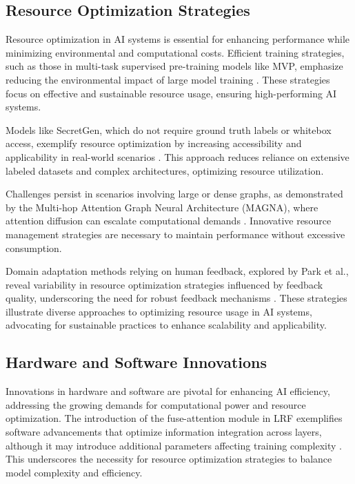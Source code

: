 
\subsection{Resource Optimization Strategies} \label{subsec:Resource Optimization Strategies}

Resource optimization in AI systems is essential for enhancing performance while minimizing environmental and computational costs. Efficient training strategies, such as those in multi-task supervised pre-training models like MVP, emphasize reducing the environmental impact of large model training \cite{tang2023mvpmultitasksupervisedpretraining}. These strategies focus on effective and sustainable resource usage, ensuring high-performing AI systems.

Models like SecretGen, which do not require ground truth labels or whitebox access, exemplify resource optimization by increasing accessibility and applicability in real-world scenarios \cite{yuan2022secretgenprivacyrecoverypretrained}. This approach reduces reliance on extensive labeled datasets and complex architectures, optimizing resource utilization.

Challenges persist in scenarios involving large or dense graphs, as demonstrated by the Multi-hop Attention Graph Neural Architecture (MAGNA), where attention diffusion can escalate computational demands \cite{wang2021multihopattentiongraphneural}. Innovative resource management strategies are necessary to maintain performance without excessive consumption.

Domain adaptation methods relying on human feedback, explored by Park et al., reveal variability in resource optimization strategies influenced by feedback quality, underscoring the need for robust feedback mechanisms \cite{park2023domainadaptationbasedhuman}. These strategies illustrate diverse approaches to optimizing resource usage in AI systems, advocating for sustainable practices to enhance scalability and applicability.

\subsection{Hardware and Software Innovations} \label{subsec:Hardware and Software Innovations}

Innovations in hardware and software are pivotal for enhancing AI efficiency, addressing the growing demands for computational power and resource optimization. The introduction of the fuse-attention module in LRF exemplifies software advancements that optimize information integration across layers, although it may introduce additional parameters affecting training complexity \cite{zheng2023layerwiserepresentationfusioncompositional}. This underscores the necessity for resource optimization strategies to balance model complexity and efficiency.

